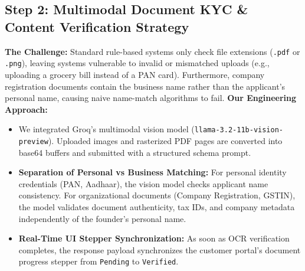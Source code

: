 \documentclass[12pt,a4paper]{article}
\begin{document}
\subsection{Step 2: Multimodal Document KYC \& Content Verification Strategy}
\textbf{The Challenge:} Standard rule-based systems only check file extensions (\texttt{.pdf} or \texttt{.png}), leaving systems vulnerable to invalid or mismatched uploads (e.g., uploading a grocery bill instead of a PAN card). Furthermore, company registration documents contain the business name rather than the applicant's personal name, causing naive name-match algorithms to fail.
\textbf{Our Engineering Approach:}
\begin{itemize}
    \item We integrated Groq's multimodal vision model (\texttt{llama-3.2-11b-vision-preview}). Uploaded images and rasterized PDF pages are converted into base64 buffers and submitted with a structured schema prompt.
    \item \textbf{Separation of Personal vs Business Matching:} For personal identity credentials (PAN, Aadhaar), the vision model checks applicant name consistency. For organizational documents (Company Registration, GSTIN), the model validates document authenticity, tax IDs, and company metadata independently of the founder's personal name.
    \item \textbf{Real-Time UI Stepper Synchronization:} As soon as OCR verification completes, the response payload synchronizes the customer portal's document progress stepper from \texttt{Pending} to \texttt{Verified}.
\end{itemize}
\end{document}
